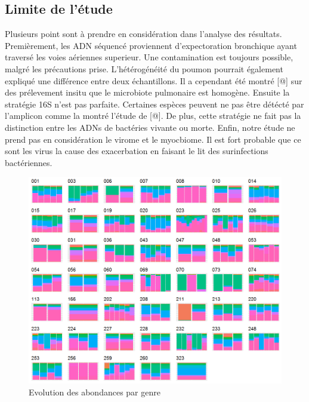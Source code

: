 \documentclass[12pt,a4paper]{article}
\begin{document}
\subsection{Limite de l'étude}
Plusieurs point sont à prendre en considération dans l’analyse des résultats. Premièrement, les ADN séquencé proviennent d’expectoration bronchique ayant traversé les voies aériennes superieur. Une contamination est toujours possible, malgré les précautions prise.
L’hétérogénéité du poumon pourrait également expliqué une différence entre deux échantillons. Il a cependant été montré [@] sur des prélevement insitu que le microbiote pulmonaire est homogène.
Ensuite la stratégie 16S n’est pas parfaite. Certaines espèces peuvent ne pas être détécté par l’amplicon comme la montré l’étude de [@]. De plus, cette stratégie ne fait pas la distinction entre les ADNs de bactéries vivante ou morte.
Enfin, notre étude ne prend pas en considération le virome et le myocbiome. Il est fort probable que ce sont les virus la cause des exacerbation en faisant le lit des surinfections bactériennes.






\begin{figure}
\begin{center}
\includegraphics[scale=0.60]{img/enfin_barplot_genus_norm.png}\hfill
\end{center}
\caption{Evolution des abondances par genre}
\label{plotabundancegenre}
\end{figure}
\end{document}
